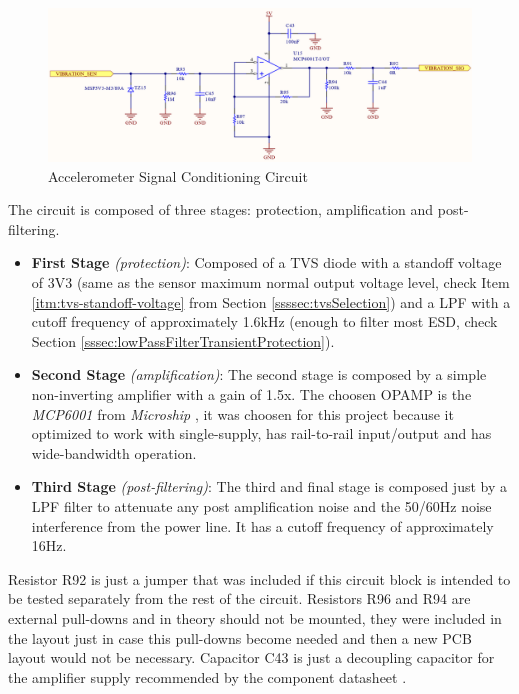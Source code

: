 	\begin{figure}[htbp]
		\centering
			\includegraphics[scale=0.95]{figuras/fig-accelerometer-signal-conditioning-circuit.jpg}
		\caption{Accelerometer Signal Conditioning Circuit \cite{accelerometer-signal-conditioning-circuit}}
		\label{fig:accelerometer-signal-conditioning-circuit}
	\end{figure}


	The circuit is composed of three stages: protection, amplification and post-filtering. 

	\begin{itemize}
		\item \textbf{First Stage} \textit{(protection)}: Composed of a TVS diode with a standoff voltage of 3V3 (same as the sensor maximum normal output voltage level, check Item \ref{itm:tvs-standoff-voltage} from Section \ref{ssssec:tvsSelection}) and a LPF with a cutoff frequency of approximately 1.6kHz (enough to filter most ESD, check Section \ref{sssec:lowPassFilterTransientProtection}). 

		\item \textbf{Second Stage} \textit{(amplification)}: The second stage is composed by a simple non-inverting amplifier with a gain of 1.5x. The choosen OPAMP is the \textit{MCP6001} from \textit{Microship} \cite{mcp6001-datasheet}, it was choosen for this project because it optimized to work with single-supply, has rail-to-rail input/output and has wide-bandwidth operation.

		\item \textbf{Third Stage} \textit{(post-filtering)}: The third and final stage is composed just by a LPF filter to attenuate any post amplification noise and the 50/60Hz noise interference from the power line. It has a cutoff frequency of approximately 16Hz.

	\end{itemize}

	Resistor R92 is just a jumper that was included if this circuit block is intended to be tested separately from the rest of the circuit. Resistors R96 and R94 are external pull-downs and in theory should not be mounted, they were included in the layout just in case this pull-downs become needed and then a new PCB layout would not be necessary. Capacitor C43 is just a decoupling capacitor for the amplifier supply recommended by the component datasheet \cite{mcp6001-datasheet}.

